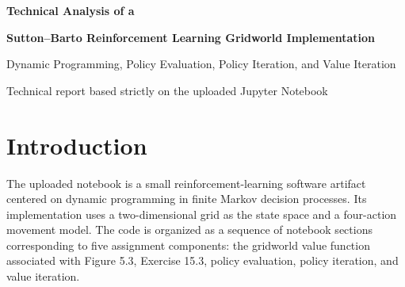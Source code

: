 \documentclass[11pt,a4paper]{article}
\begin{document}
\begin{titlepage}
\centering
\vspace*{34mm}
{\LARGE\bfseries Technical Analysis of a\par}
\vspace{4mm}
{\LARGE\bfseries Sutton--Barto Reinforcement Learning Gridworld Implementation\par}
\vspace{10mm}
{\large Dynamic Programming, Policy Evaluation, Policy Iteration, and Value Iteration\par}
\vfill
{\large Technical report based strictly on the uploaded Jupyter Notebook\par}
\thispagestyle{empty}
\end{titlepage}

\tableofcontents
\newpage

\begin{abstract}
This report provides a rigorous software and methodological analysis of a compact Jupyter Notebook implementing several dynamic-programming exercises from reinforcement learning. The notebook defines a common \(5\times5\) gridworld, implements the special transition structure used for the Sutton--Barto Figure 5.3 setting, evaluates a uniform random policy, performs policy iteration, and performs value iteration. The analysis reconstructs the data flow, state and action representations, Bellman equations, convergence tests, update schemes, policy extraction, persistence of outputs, and practical implementation choices. A separate notebook section labelled Exercise 15.3 is explicitly identified as a placeholder rather than a completed exercise; no unsupported completion claim is made. The report therefore distinguishes carefully between implemented functionality, textbook theory, and conclusions that cannot be established from the source alone.
\end{abstract}

\section{Introduction}
The uploaded notebook is a small reinforcement-learning software artifact centered on dynamic programming in finite Markov decision processes. Its implementation uses a two-dimensional grid as the state space and a four-action movement model. The code is organized as a sequence of notebook sections corresponding to five assignment components: the gridworld value function associated with Figure 5.3, Exercise 15.3, policy evaluation, policy iteration, and value iteration.
\end{document}
